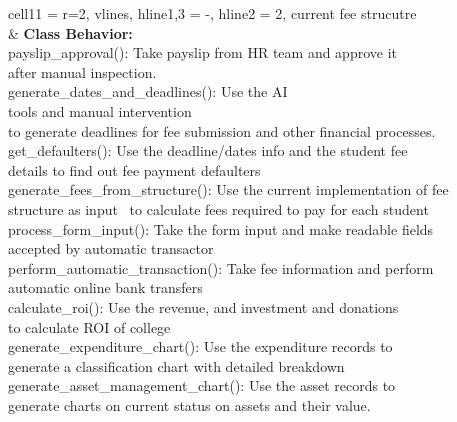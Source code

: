 \documentclass[11pt]{article}
\begin{document}
\begin{longtblr}[
  label = none,
  entry = none,
]{
  cell{1}{1} = {r=2}{},
  vlines,
  hline{1,3} = {-}{},
  hline{2} = {2}{},
}
{\hspace{\dimexpr\labelsep+0.5\tabcolsep}current fee strucutre}                                                                                                                                                                                                                                                                                 \\
              & {\textbf{Class Behavior:}\\
\hspace{\dimexpr\labelsep+0.5\tabcolsep}payslip\_approval(): Take payslip from HR team and approve it\\ after manual inspection.\\
\hspace{\dimexpr\labelsep+0.5\tabcolsep}generate\_dates\_and\_deadlines(): Use the AI \\
tools and manual intervention
\\to generate deadlines for fee submission and other financial processes.\\
\hspace{\dimexpr\labelsep+0.5\tabcolsep}get\_defaulters(): Use the deadline/dates info and the student
fee \\details to find out fee payment defaulters\\
\hspace{\dimexpr\labelsep+0.5\tabcolsep}generate\_fees\_from\_structure(): Use the current implementation of fee\\
 structure as input~ to calculate fees required to pay for each student\\
\hspace{\dimexpr\labelsep+0.5\tabcolsep}process\_form\_input(): Take the form input and make readable fields\\
 accepted by automatic transactor\\
\hspace{\dimexpr\labelsep+0.5\tabcolsep}perform\_automatic\_transaction(): Take fee information and perform \\
automatic online bank transfers\\
\hspace{\dimexpr\labelsep+0.5\tabcolsep}calculate\_roi(): Use the revenue, and investment and donations\\
 to calculate ROI of college\\
\hspace{\dimexpr\labelsep+0.5\tabcolsep}generate\_expenditure\_chart(): Use the expenditure records to\\
 generate a classification chart with detailed breakdown\\
\hspace{\dimexpr\labelsep+0.5\tabcolsep}generate\_asset\_management\_chart(): Use the asset records to\\
 generate charts on current status on assets and their value. \\
 }
\end{longtblr}
\end{document}

